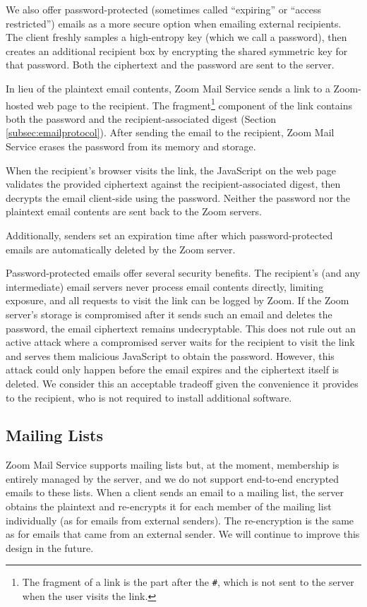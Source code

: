 We also offer password-protected (sometimes called ``expiring'' or ``access restricted'') emails as
a more secure option when emailing external recipients. The client freshly samples a high-entropy
key (which we call a password), then creates an additional recipient box by encrypting the shared
symmetric key for that password. Both the ciphertext and the password are sent to the server.

In lieu of the plaintext email contents, Zoom Mail Service sends a link to a Zoom-hosted web page to
the recipient. The fragment\footnote{The fragment of a link is the part after the \texttt{\#}, which
is not sent to the server when the user visits the link.} component of the link contains both the
password and the recipient-associated digest (Section \ref{subsec:emailprotocol}). After sending the
email to the recipient, Zoom Mail Service erases the password from its memory and storage.

When the recipient's browser visits the link, the JavaScript on the web page validates the provided
ciphertext against the recipient-associated digest, then decrypts the email client-side using the
password. Neither the password nor the plaintext email contents are sent back to the Zoom servers. 

Additionally, senders set an expiration time after which password-protected emails are automatically
deleted by the Zoom server.

Password-protected emails offer several security benefits. The recipient's (and any intermediate)
email servers never process email contents directly, limiting exposure, and all requests to visit
the link can be logged by Zoom. If the Zoom server's storage is compromised after it sends such an
email and deletes the password, the email ciphertext remains undecryptable. This does not rule out
an active attack where a compromised server waits for the recipient to visit the link and serves
them malicious JavaScript to obtain the password. However, this attack could only happen before the
email expires and the ciphertext itself is deleted. We consider this an acceptable tradeoff given
the convenience it provides to the recipient, who is not required to install additional software.

\subsection{Mailing Lists}

Zoom Mail Service supports mailing lists but, at the moment, membership is entirely managed by the
server, and we do not support end-to-end encrypted emails to these lists. When a client sends an
email to a mailing list, the server obtains the plaintext and re-encrypts it for each member of the
mailing list individually (as for emails from external senders). The re-encryption is the same as
for emails that came from an external sender. We will continue to improve this design in the future.


